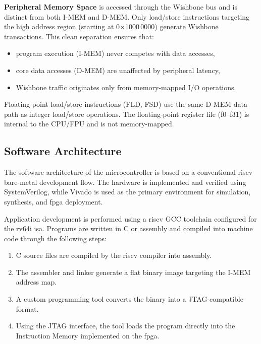 \begin{itemize}
            \textbf{Peripheral Memory Space} is accessed through the Wishbone bus and is distinct from both \gls{I-MEM}
            and \gls{D-MEM}. Only load/store instructions targeting the high address region (starting at 0$\times$1000\,0000)
            generate Wishbone transactions. This clean separation ensures that:
            \begin{itemize}
                  \item program execution (\gls{I-MEM}) never competes with data accesses,
                  \item core data accesses (\gls{D-MEM}) are unaffected by peripheral latency,
                  \item Wishbone traffic originates only from memory-mapped I/O operations.
            \end{itemize}

            Floating-point load/store instructions (FLD, FSD) use the same D-MEM data path
            as integer load/store operations. The floating-point register file (f0–f31) is
            internal to the CPU/FPU and is not memory-mapped.

            \subsection{Software Architecture}
            The software architecture of the microcontroller is based on a conventional
            \gls{riscv} bare-metal development flow. The hardware is implemented and
            verified using SystemVerilog, while Vivado is used as the primary environment
            for simulation, synthesis, and \gls{fpga} deployment.

            Application development is performed using a \gls{riscv} GCC toolchain
            configured for the \gls{rv64i} \gls{isa}. Programs are written in C or assembly
            and compiled into machine code through the following steps:
            \begin{enumerate}
                  \item C source files are compiled by the \gls{riscv} compiler into assembly.
                  \item The assembler and linker generate a flat binary image targeting the \gls{I-MEM}
                        address map.
                  \item A custom programming tool converts the binary into a JTAG-compatible format.
                  \item Using the JTAG interface, the tool loads the program directly into the
                        Instruction Memory implemented on the \gls{fpga}.
            \end{enumerate}


\end{itemize}
